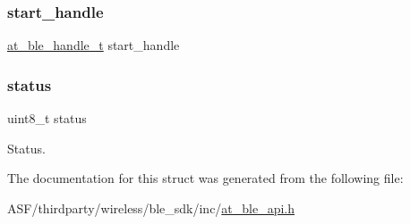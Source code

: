 \subsubsection{\texorpdfstring{start\_handle}{start\_handle}}
{\footnotesize\ttfamily \mbox{\hyperlink{at__ble__api_8h_abd23646d0c662860741f787efc8456f2}{at\+\_\+ble\+\_\+handle\+\_\+t}} start\+\_\+handle}

\mbox{\label{structat__ble__htpt__create__db__cfm__t_ade818037fd6c985038ff29656089758d}} 
\subsubsection{\texorpdfstring{status}{status}}
{\footnotesize\ttfamily uint8\+\_\+t status}



Status. 



The documentation for this struct was generated from the following file\+:\begin{DoxyCompactItemize}
\item 
A\+S\+F/thirdparty/wireless/ble\+\_\+sdk/inc/\mbox{\hyperlink{at__ble__api_8h}{at\+\_\+ble\+\_\+api.\+h}}\end{DoxyCompactItemize}
